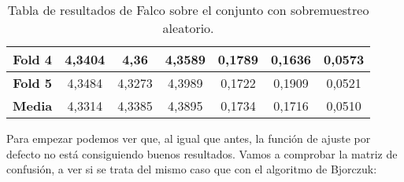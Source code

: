 \begin{table}[H]
{\begin{tabular}{|ccccccc|}
\multicolumn{1}{|c|}{\textbf{Fold 4}} & \multicolumn{1}{c|}{4,3404}            & \multicolumn{1}{c|}{4,36}                & \multicolumn{1}{c|}{4,3589}          & \multicolumn{1}{c|}{0,1789}            & \multicolumn{1}{c|}{0,1636}              & 0,0573          \\ \hline
\multicolumn{1}{|c|}{\textbf{Fold 5}} & \multicolumn{1}{c|}{4,3484}            & \multicolumn{1}{c|}{4,3273}              & \multicolumn{1}{c|}{4,3989}          & \multicolumn{1}{c|}{0,1722}            & \multicolumn{1}{c|}{0,1909}              & 0,0521          \\ \hline
\multicolumn{1}{|c|}{\textbf{Media}}  & \multicolumn{1}{c|}{4,3314}            & \multicolumn{1}{c|}{4,3385}              & \multicolumn{1}{c|}{4,3895}          & \multicolumn{1}{c|}{0,1734}            & \multicolumn{1}{c|}{0,1716}              & 0,0510          \\ \hline
\end{tabular}%
}
\caption{Tabla de resultados de Falco sobre el conjunto con sobremuestreo aleatorio.}\label{tablaFALCOdefecto}
\end{table}

Para empezar podemos ver que, al igual que antes, la función de ajuste por defecto no está consiguiendo buenos resultados. Vamos a comprobar la matriz de confusión, a ver si se trata del mismo caso que con el algoritmo de Bjorczuk:


